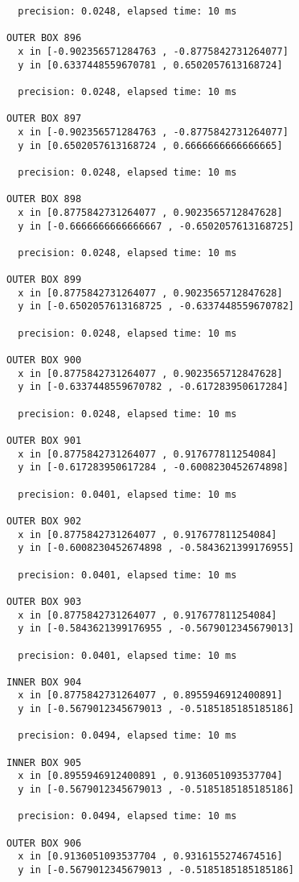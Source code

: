 \begin{verbatim}
  precision: 0.0248, elapsed time: 10 ms

OUTER BOX 896
  x in [-0.902356571284763 , -0.8775842731264077]
  y in [0.6337448559670781 , 0.6502057613168724]

  precision: 0.0248, elapsed time: 10 ms

OUTER BOX 897
  x in [-0.902356571284763 , -0.8775842731264077]
  y in [0.6502057613168724 , 0.6666666666666665]

  precision: 0.0248, elapsed time: 10 ms

OUTER BOX 898
  x in [0.8775842731264077 , 0.9023565712847628]
  y in [-0.6666666666666667 , -0.6502057613168725]

  precision: 0.0248, elapsed time: 10 ms

OUTER BOX 899
  x in [0.8775842731264077 , 0.9023565712847628]
  y in [-0.6502057613168725 , -0.6337448559670782]

  precision: 0.0248, elapsed time: 10 ms

OUTER BOX 900
  x in [0.8775842731264077 , 0.9023565712847628]
  y in [-0.6337448559670782 , -0.617283950617284]

  precision: 0.0248, elapsed time: 10 ms

OUTER BOX 901
  x in [0.8775842731264077 , 0.917677811254084]
  y in [-0.617283950617284 , -0.6008230452674898]

  precision: 0.0401, elapsed time: 10 ms

OUTER BOX 902
  x in [0.8775842731264077 , 0.917677811254084]
  y in [-0.6008230452674898 , -0.5843621399176955]

  precision: 0.0401, elapsed time: 10 ms

OUTER BOX 903
  x in [0.8775842731264077 , 0.917677811254084]
  y in [-0.5843621399176955 , -0.5679012345679013]

  precision: 0.0401, elapsed time: 10 ms

INNER BOX 904
  x in [0.8775842731264077 , 0.8955946912400891]
  y in [-0.5679012345679013 , -0.5185185185185186]

  precision: 0.0494, elapsed time: 10 ms

INNER BOX 905
  x in [0.8955946912400891 , 0.9136051093537704]
  y in [-0.5679012345679013 , -0.5185185185185186]

  precision: 0.0494, elapsed time: 10 ms

OUTER BOX 906
  x in [0.9136051093537704 , 0.9316155274674516]
  y in [-0.5679012345679013 , -0.5185185185185186]


\end{verbatim}
